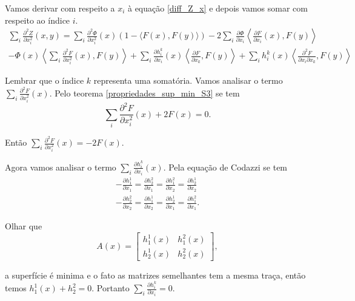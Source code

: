 \begin{demonstracao}
	Vamos derivar com respeito a $x_i$ à equação \ref{diff_Z_x} e depois vamos somar com respeito ao índice $i$.
	\begin{multline}\label{Z_seg_dev_x}
		\sum_i \frac{\partial^2 Z}{\partial x_i^2}(x,y) = \sum_i \frac{\partial^2 \Phi}{\partial x_i^2}(x)(1 - \langle F(x), F(y) \rangle) -2  \sum_i \frac{\partial \Phi}{\partial x_i} \left\langle \frac{\partial F}{\partial x_i}(x), F(y) \right\rangle\\
		 -  \Phi(x) \left\langle \sum_i \frac{\partial^2 F}{\partial x_i^2}(x), F(y) \right\rangle + \sum_i \frac{\partial h_i^k}{\partial x_i}(x) \left\langle \frac{\partial F}{\partial x_k}, F(y) \right\rangle + \sum_i h_i^k(x) \left\langle \frac{\partial^2 F}{\partial x_i \partial x_k}, F(y) \right\rangle
	\end{multline}
	
	Lembrar que o índice $k$ representa uma somatória. Vamos analisar o termo $\sum_i \frac{\partial^2 F}{\partial x_i^2}(x)$. Pelo teorema \ref{propriedades_sup_min_S3} se tem
	\begin{equation*}
		\sum_i \frac{\partial^2 F}{\partial x_i^2}(x) + 2 F(x) = 0.
	\end{equation*}
	
	Então $\sum_i \frac{\partial^2 F}{\partial x_i^2}(x) = -2 F(x) $.
	
	Agora vamos analisar o termo $\sum_i \frac{\partial h_i^k}{\partial x_i}(x)$. Pela equação de Codazzi se tem
	\begin{equation}\label{codazzi_eq}
		\begin{split}
		-\frac{\partial h_1^1}{\partial x_1} = \frac{\partial h_2^2}{\partial x_1} = \frac{\partial h_1^2}{\partial x_2} = \frac{\partial h_2^1}{\partial x_2}\\
		-\frac{\partial h_2^2}{\partial x_2} = \frac{\partial h_1^1}{\partial x_2} = \frac{\partial h_2^1}{\partial x_1} = \frac{\partial h_1^2}{\partial x_1}.
		\end{split}		
	\end{equation}
	
	Olhar que 
	\begin{equation*}
		A(x) = \left[\begin{matrix}
		h_1^1(x) & h_1^2(x)\\
		h_2^1(x) & h_2^2(x)
		\end{matrix}\right],
	\end{equation*}
	
	a superfície é minima e o fato as matrizes semelhantes tem a mesma traça, então temos $h_1^1(x) + h_2^2 = 0$. Portanto $\sum_i \frac{\partial h_i^k}{\partial x_i} = 0$.
	

\end{demonstracao}

